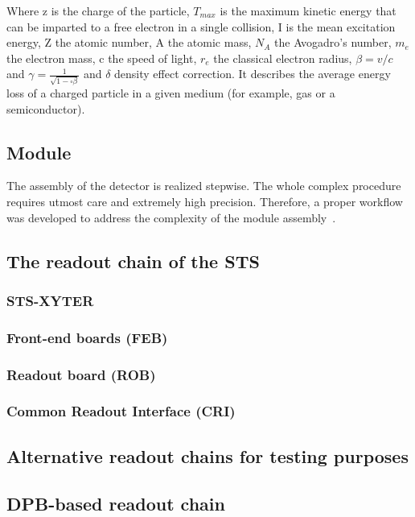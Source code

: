 Where z is the charge of the particle, $T_{max}$ is the maximum kinetic energy that can be imparted to a free electron in a single collision, I is the mean excitation energy, Z the atomic number, A the atomic mass, $N_{A}$ the Avogadro’s number, $m_{e}$ the electron mass, c the speed of light, $r_{e}$ the classical electron radius, $\beta = v/c$ and $\gamma = \frac{1}{\sqrt{1-\square\beta}}$ and $\delta$ density effect correction. It describes the average energy loss of a charged particle in a given medium (for example, gas or a semiconductor). 




\subsection{Module}
\label{module}
 The assembly of the detector is realized stepwise. The whole complex procedure requires utmost care and extremely high precision. Therefore, a proper workflow was developed to address the complexity of the module assembly~\cite{carmen2}.

\subsection{The readout chain of the STS}
\label{readout}
\label{DAQ}
\subsubsection{STS-XYTER}

\subsubsection{Front-end boards (FEB)}

\subsubsection{Readout board (ROB)}

\subsubsection{Common Readout Interface (CRI)}
\subsection{Alternative readout chains for testing purposes}

\subsection{DPB-based readout chain}

